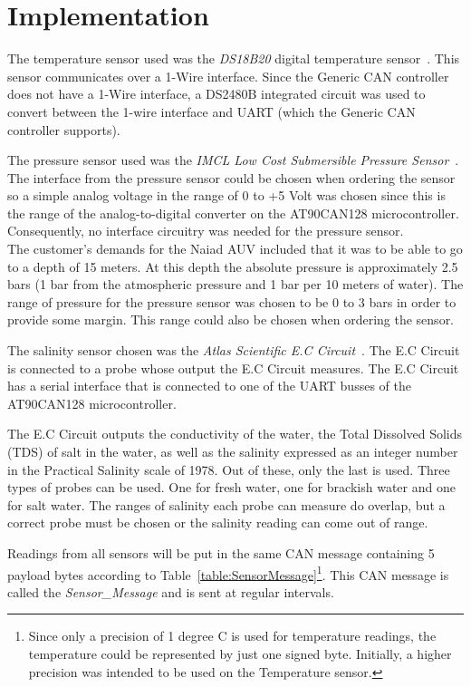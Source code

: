 
\section{Implementation}\label{sec:implementation}
The temperature sensor used was the \emph{DS18B20} digital temperature sensor~\cite{web:ds18b20}. This sensor communicates over a 1-Wire interface. Since the Generic CAN controller does not have a 1-Wire interface, a DS2480B integrated circuit was used to convert between the 1-wire interface and UART (which the Generic CAN controller supports).

The pressure sensor used was the \emph{IMCL Low Cost Submersible Pressure Sensor}~\cite{web:imcl}. The interface from the pressure sensor could be chosen when ordering the sensor so a simple analog voltage in the range of 0 to +5 Volt was chosen since this is the range of the analog-to-digital converter on the AT90CAN128 microcontroller. Consequently, no interface circuitry was needed for the pressure sensor.\\
The customer's demands for the Naiad AUV included that it was to be able to go to a depth of 15 meters. At this depth the absolute pressure is approximately 2.5 bars (1 bar from the atmospheric pressure and 1 bar per 10 meters of water). The range of pressure for the pressure sensor was chosen to be 0 to 3 bars in order to provide some margin. This range could also be chosen when ordering the sensor.

The salinity sensor chosen was the \emph{Atlas Scientific E.C Circuit}~\cite{web:ec_circuit}. The E.C Circuit is connected to a probe whose output the E.C Circuit measures. The E.C Circuit has a serial interface that is connected to one of the UART busses of the AT90CAN128 microcontroller. %

The E.C Circuit outputs the conductivity of the water, the Total Dissolved Solids (TDS) of salt in the water, as well as the salinity expressed as an integer number in the Practical Salinity scale of 1978. Out of these, only the last is used. \newline
Three types of probes can be used. One for fresh water, one for brackish water and one for salt water. The ranges of salinity each probe can measure do overlap, but a correct probe must be chosen or the salinity reading can come out of range. 

Readings from all sensors will be put in the same CAN message containing 5 payload bytes according to Table~\ref{table:SensorMessage}\footnote{Since only a precision of 1 degree C is used for temperature readings, the temperature could be represented by just one signed byte. Initially, a higher precision was intended to be used on the Temperature sensor.}. This CAN message is called the \emph{Sensor\_Message} and is sent at regular intervals.

